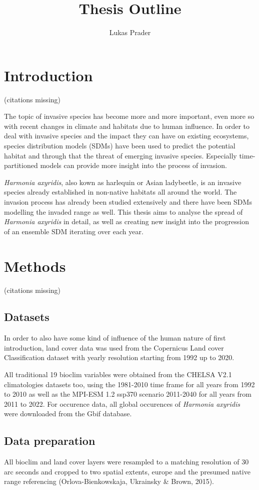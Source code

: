 \documentclass[11pt,a4paper]{article}
\begin{document}
\title{Thesis Outline}
\author{Lukas Prader}
\date{}
\maketitle

\section{Introduction}
(citations missing)

The topic of invasive species has become more and more important, even more so with recent changes in climate and habitats due to human influence.
In order to deal with invasive species and the impact they can have on existing ecosystems, species distribution models (SDMs) have been used to predict the potential habitat and through that the threat of emerging invasive species.
Especially time-partitioned models can provide more insight into the process of invasion.

\textit{Harmonia axyridis}, also kown as harlequin or Asian ladybeetle, is an invasive species already established in non-native habitats all around the world.
The invasion process has already been studied extensively and there have been SDMs modelling the invaded range as well. 
This thesis aims to analyse the spread of \textit{Harmonia axyridis} in detail, as well as creating new insight into the progression of an ensemble SDM iterating over each year. 

\newpage
\section{Methods}
(citations missing)
\subsection{Datasets}
In order to also have some kind of influence of the human nature of first introduction, land cover data was used from the Copernicus Land cover Classification dataset with yearly resolution starting from 1992 up to 2020.

All traditional 19 bioclim variables were obtained from the CHELSA V2.1 climatologies datasets too, using the 1981-2010 time frame for all years from 1992 to 2010 as well as the MPI-ESM 1.2 ssp370 scenario 2011-2040 for all years from 2011 to 2022. 
For occurence data, all global occurences of \textit{Harmonia axyridis} were downloaded from the Gbif database.

\subsection{Data preparation}
All bioclim and land cover layers were resampled to a matching resolution of 30 arc seconds and cropped to two spatial extents, europe and the presumed native range referencing (Orlova-Bienkowskaja, Ukrainsky \& Brown, 2015).
\end{document}
